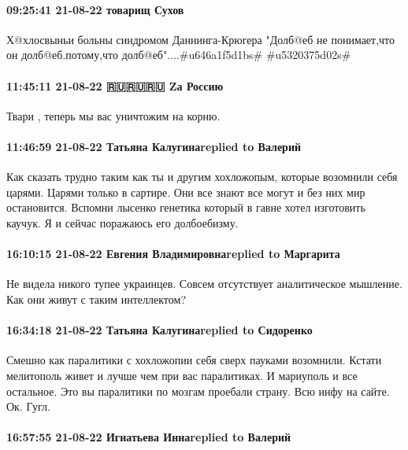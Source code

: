 \paragraph{09:25:41 21-08-22 товарищ Сухов}

Х@хлосвыньи больны синдромом Даннинга-Крюгера "Долб@еб не понимает,что он долб@еб.потому,что долб@еб"....#u646a1f5d1bs# #u5320375d02s#

\paragraph{11:45:11 21-08-22 🇷🇺🇷🇺🇷🇺 Zа Россию}

Твари , теперь мы вас уничтожим на корню.

\paragraph{11:46:59 21-08-22 Татьяна Калугинаreplied to Валерий}

Как сказать трудно таким как ты и другим хохложопым, которые возомнили себя
царями. Царями только в сартире. Они все знают все могут и без них мир
остановится. Вспомни лысенко генетика который в гавне хотел изготовить каучук.
Я и сейчас поражаюсь его долбоебизму.

\paragraph{16:10:15 21-08-22 Евгения Владимировнаreplied to Маргарита}

Не видела никого тупее украинцев. Совсем отсутствует аналитическое мышление.
Как они живут с таким интеллектом?

\paragraph{16:34:18 21-08-22 Татьяна Калугинаreplied to Сидоренко}

Смешно как паралитики с хохложопии себя сверх пауками возомнили. Кстати
мелитополь живет и лучше чем при вас паралитиках. И мариуполь и все остальное.
Это вы паралитики по мозгам проебали страну. Всю инфу на сайте. Ок. Гугл.

\paragraph{16:57:55 21-08-22 Игнатьева Иннаreplied to Валерий}

